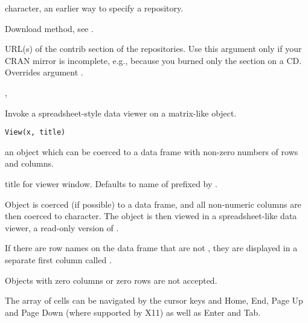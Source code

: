 %
\begin{Arguments}
\begin{ldescription}
\item[\code{CRAN}] character, an earlier way to specify a repository.
\item[\code{method}] Download method, see .
\item[\code{contriburl}] URL(s) of the contrib section of the
repositories. Use this argument only if your CRAN mirror is
incomplete, e.g., because you burned only the  section on a
CD.  Overrides argument .
 
\end{ldescription}
\end{Arguments}
%
\begin{SeeAlso}\relax
{}, 
\end{SeeAlso}
%
\begin{Description}\relax
Invoke a spreadsheet-style data viewer on a matrix-like \R{} object.
\end{Description}
%
\begin{Usage}
\begin{verbatim}
View(x, title)
\end{verbatim}
\end{Usage}
%
\begin{Arguments}
\begin{ldescription}
\item[\code{x}] an \R{} object which can be coerced to a data frame with
non-zero numbers of rows and columns.
\item[\code{title}] title for viewer window.  Defaults to name of 
prefixed by .
\end{ldescription}
\end{Arguments}
%
\begin{Details}\relax
Object  is coerced (if possible) to a data frame, and all
non-numeric columns are then coerced to character.   The object is
then viewed in a spreadsheet-like data viewer, a read-only version of
.

If there are row names on the data frame that are not ,
they are displayed in a separate first column called .

Objects with zero columns or zero rows are not accepted.

The array of cells can be navigated by the cursor keys and Home, End,
Page Up and Page Down (where supported by X11) as well as Enter
and Tab.
\end{Details}
